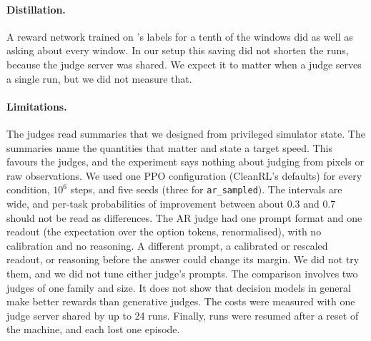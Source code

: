 \paragraph{Distillation.} A reward network trained on \kev{}'s labels for a tenth of the windows did as well as asking
\kev{} about every window. In our setup this saving did not shorten the runs, because the judge server was shared. We
expect it to matter when a judge serves a single run, but we did not measure that.

\paragraph{Limitations.} The judges read summaries that we designed from privileged simulator state. The summaries name
the quantities that matter and state a target speed. This favours the judges, and the experiment says nothing about
judging from pixels or raw observations. We used one PPO configuration (CleanRL's defaults) for every condition,
$10^6$ steps, and five seeds (three for \texttt{ar\_sampled}). The intervals are wide, and per-task probabilities of
improvement between about 0.3 and 0.7 should not be read as differences. The AR judge had one prompt format and one
readout (the expectation over the option tokens, renormalised), with no calibration and no reasoning. A different prompt,
a calibrated or rescaled readout, or reasoning before the answer could change its margin. We did not try them, and we did
not tune either judge's prompts. The comparison involves two judges of one family and size. It does not show that
decision models in general make better rewards than generative judges. The costs were measured with one judge server
shared by up to 24 runs. Finally,  runs were resumed after a reset of the machine, and each lost one
episode.

